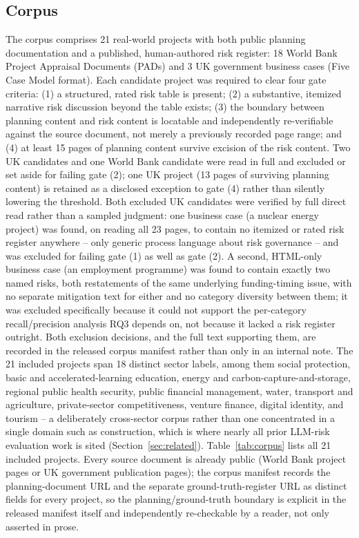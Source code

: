 \documentclass[conference]{IEEEtran}
\begin{document}
\subsection{Corpus}
The corpus comprises 21 real-world projects with both public planning
documentation and a published, human-authored risk register: 18 World Bank
Project Appraisal Documents (PADs) and 3 UK government business cases
(Five Case Model format). Each candidate project was required to clear four
gate criteria: (1) a structured, rated risk table is present; (2) a
substantive, itemized narrative risk discussion beyond the table exists;
(3) the boundary between planning content and risk content is locatable and
independently re-verifiable against the source document, not merely a
previously recorded page range; and (4) at least 15 pages of planning
content survive excision of the risk content. Two UK candidates and one
World Bank candidate were read in full and excluded or set aside for
failing gate (2); one UK project (13 pages of surviving planning content)
is retained as a disclosed exception to gate (4) rather than silently
lowering the threshold. Both excluded UK candidates were verified by full
direct read rather than a sampled judgment: one business case (a nuclear
energy project) was found, on reading all 23 pages, to contain no
itemized or rated risk register anywhere -- only generic process language
about risk governance -- and was excluded for failing gate (1) as well as
gate (2). A second, HTML-only business case (an employment programme) was
found to contain exactly two named risks, both restatements of the same
underlying funding-timing issue, with no separate mitigation text for
either and no category diversity between them; it was excluded specifically
because it could not support the per-category recall/precision analysis
RQ3 depends on, not because it lacked a risk register outright. Both
exclusion decisions, and the full text supporting them, are recorded in the
released corpus manifest rather than only in an internal note. The 21 included projects span 18 distinct sector
labels, among them social protection, basic and accelerated-learning
education, energy and carbon-capture-and-storage, regional public health
security, public financial management, water, transport and agriculture,
private-sector competitiveness, venture finance, digital identity, and
tourism -- a deliberately cross-sector corpus rather than one concentrated
in a single domain such as construction, which is where nearly all prior
LLM-risk evaluation work is sited (Section~\ref{sec:related}).
Table~\ref{tab:corpus} lists all 21 included projects. Every source
document is already public (World Bank project pages or UK government
publication pages); the corpus manifest records the planning-document URL
and the separate ground-truth-register URL as distinct fields for every
project, so the planning/ground-truth boundary is explicit in the released
manifest itself and independently re-checkable by a reader, not only
asserted in prose.
\end{document}
